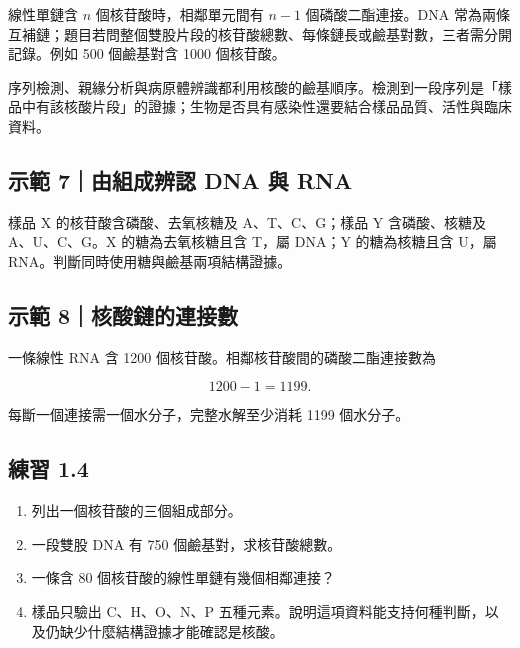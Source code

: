 \documentclass[11pt,a4paper]{article}
\providecommand{\tightlist}{%
  \setlength{\itemsep}{0pt}\setlength{\parskip}{0pt}}
\begin{document}
線性單鏈含 \(n\) 個核苷酸時，相鄰單元間有 \(n-1\) 個磷酸二酯連接。DNA 常為兩條互補鏈；題目若問整個雙股片段的核苷酸總數、每條鏈長或鹼基對數，三者需分開記錄。例如 500 個鹼基對含 1000 個核苷酸。

序列檢測、親緣分析與病原體辨識都利用核酸的鹼基順序。檢測到一段序列是「樣品中有該核酸片段」的證據；生物是否具有感染性還要結合樣品品質、活性與臨床資料。

\begin{HandoutWorkedExample}

\subsection{示範 7｜由組成辨認 DNA 與 RNA}\label{ux793aux7bc4-7ux7531ux7d44ux6210ux8fa8ux8a8d-dna-ux8207-rna}

樣品 X 的核苷酸含磷酸、去氧核糖及 A、T、C、G；樣品 Y 含磷酸、核糖及 A、U、C、G。X 的糖為去氧核糖且含 T，屬 DNA；Y 的糖為核糖且含 U，屬 RNA。判斷同時使用糖與鹼基兩項結構證據。

\end{HandoutWorkedExample}

\begin{HandoutWorkedExample}

\subsection{示範 8｜核酸鏈的連接數}\label{ux793aux7bc4-8ux6838ux9178ux93c8ux7684ux9023ux63a5ux6578}

一條線性 RNA 含 1200 個核苷酸。相鄰核苷酸間的磷酸二酯連接數為

\[
1200-1=1199.
\]

每斷一個連接需一個水分子，完整水解至少消耗 1199 個水分子。

\end{HandoutWorkedExample}

\subsection{練習 1.4}\label{ux7df4ux7fd2-1.4}

\begin{enumerate}
\def\labelenumi{\arabic{enumi}.}
\tightlist
\item
  列出一個核苷酸的三個組成部分。
\item
  一段雙股 DNA 有 750 個鹼基對，求核苷酸總數。
\item
  一條含 80 個核苷酸的線性單鏈有幾個相鄰連接？
\item
  樣品只驗出 C、H、O、N、P 五種元素。說明這項資料能支持何種判斷，以及仍缺少什麼結構證據才能確認是核酸。
\end{enumerate}
\end{document}
